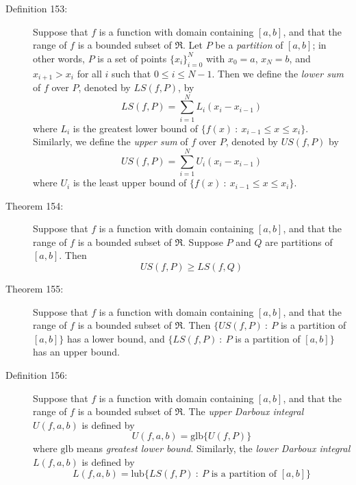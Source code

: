\documentclass{article}
\begin{document}
\begin{description}

  \item[Definition 153:] Suppose that $f$ is a function with domain containing $[a,b]$, and that the range of $f$ is a bounded subset of $\Re$. Let $P$ be a \emph{partition} of $[a,b]$; in other words, $P$ is a set of points $\{ x_{i} \} _{i=0}^{N}$ with $x_{0}=a$, $x_{N}=b$, and $x_{i+1} > x_{i}$ for all $i$ such that $0 \leq i \leq N-1$. Then we define the \emph{lower sum} of $f$ over $P$, denoted by $LS(f,P)$, by
    \begin{equation*}
    LS(f,P) = \sum_{i=1}^{N} L_{i} (x_{i} - x_{i-1})
    \end{equation*}
    where $L_{i}$ is the greatest lower bound of $\{ f(x)\ :\ x_{i-1} \leq x \leq x_{i} \}$. Similarly, we define the \emph{upper sum} of $f$ over $P$, denoted by $US(f,P)$ by
    \begin{equation*}
    US(f,P) = \sum_{i=1}^{N} U_{i} (x_{i} - x_{i-1})
    \end{equation*}
    where $U_{i}$ is the least upper bound of $\{ f(x)\ :\ x_{i-1} \leq x \leq x_{i} \}$.

  \item[Theorem 154:] Suppose that $f$ is a function with domain containing $[a,b]$, and that the range of $f$ is a bounded subset of $\Re$. Suppose $P$ and $Q$ are partitions of $[a,b]$. Then
    \begin{equation*}
    US(f,P) \geq LS(f,Q)
    \end{equation*}

  \item[Theorem 155:] Suppose that $f$ is a function with domain containing $[a,b]$, and that the range of $f$ is a bounded subset of $\Re$. Then $\{ US(f,P)\ :\ P$ is a partition of $[a,b] \}$ has a lower bound, and $\{ LS(f,P)\ :\ P$ is a partition of $[a,b] \}$ has an upper bound. 

  \item[Definition 156:] Suppose that $f$ is a function with domain containing $[a,b]$, and that the range of $f$ is a bounded subset of $\Re$. The \emph{upper Darboux integral} $U(f,a,b)$ is defined by
    \begin{equation*}
    U(f,a,b) = \text{glb} \{ U(f,P) \}
    \end{equation*}
    where $\text{glb}$ means \emph{greatest lower bound}. Similarly, the \emph{lower Darboux integral} $L(f,a,b)$ is defined by
    \begin{equation*}
    L(f,a,b) = \text{lub} \{ LS(f,P)\ :\ P \text{ is a partition of } [a,b] \}
    \end{equation*}


\end{description}
\end{document}
